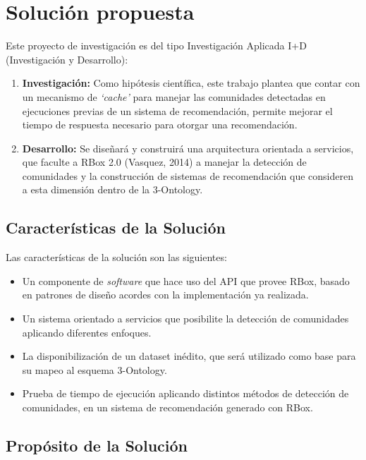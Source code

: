 \section{Soluci\'on propuesta}
\label{intro:solucion}

Este proyecto de investigación es del tipo Investigación Aplicada I+D (Investigación y Desarrollo):

\begin{enumerate}
  \item \textbf{Investigación:} Como hipótesis científica, este trabajo plantea que contar con un mecanismo de \textit{‘cache’} para manejar las comunidades detectadas en ejecuciones previas de un sistema de recomendación, permite mejorar el tiempo de respuesta necesario para otorgar una recomendación.
  \item \textbf{Desarrollo:} Se diseñará y construirá una arquitectura orientada a servicios, que faculte a RBox 2.0 (Vasquez, 2014) a manejar la detección de comunidades y la construcción de sistemas de recomendación que consideren a esta dimensión dentro de la 3-Ontology.
\end{enumerate}

\subsection{Caracter\'isticas de la Soluci\'on}

Las características de la solución son las siguientes:

\begin{itemize}
  \item Un componente de \textit{software} que hace uso del API que provee RBox, basado en patrones de diseño acordes con la implementación ya realizada.
  \item Un sistema orientado a servicios que posibilite la detección de comunidades aplicando diferentes enfoques.
  \item La disponibilización de un dataset inédito, que será utilizado como base para su mapeo al esquema 3-Ontology.
  \item Prueba de tiempo de ejecución aplicando distintos métodos de detección de comunidades, en un sistema de recomendación generado con RBox.
\end{itemize}

\subsection{Prop\'osito de la Soluci\'on}

